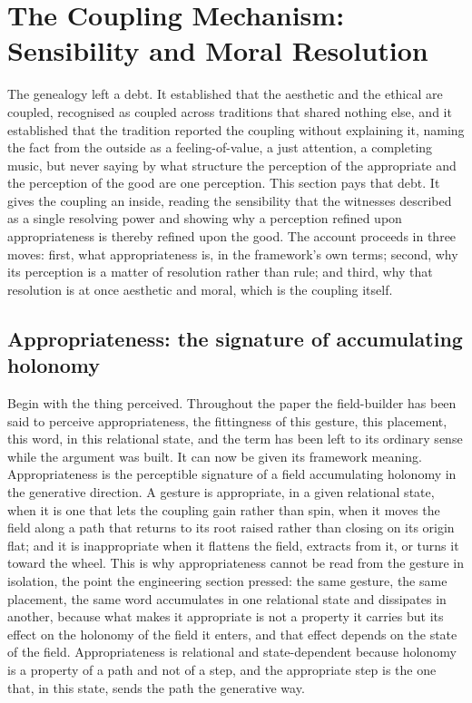 \section{The Coupling Mechanism: Sensibility and Moral Resolution}
\label{p22:sec:coupling}

\noindent
The genealogy left a debt. It established that the aesthetic and the ethical are coupled, recognised as coupled across traditions that shared nothing else, and it established that the tradition reported the coupling without explaining it, naming the fact from the outside as a feeling-of-value, a just attention, a completing music, but never saying by what structure the perception of the appropriate and the perception of the good are one perception. This section pays that debt. It gives the coupling an inside, reading the sensibility that the witnesses described as a single resolving power and showing why a perception refined upon appropriateness is thereby refined upon the good. The account proceeds in three moves: first, what appropriateness is, in the framework's own terms; second, why its perception is a matter of resolution rather than rule; and third, why that resolution is at once aesthetic and moral, which is the coupling itself.

\subsection{Appropriateness: the signature of accumulating holonomy}
\label{p22:sub:coupling-appropriateness}

Begin with the thing perceived. Throughout the paper the field-builder has been said to perceive appropriateness, the fittingness of this gesture, this placement, this word, in this relational state, and the term has been left to its ordinary sense while the argument was built. It can now be given its framework meaning. Appropriateness is the perceptible signature of a field accumulating holonomy in the generative direction. A gesture is appropriate, in a given relational state, when it is one that lets the coupling gain rather than spin, when it moves the field along a path that returns to its root raised rather than closing on its origin flat; and it is inappropriate when it flattens the field, extracts from it, or turns it toward the wheel. This is why appropriateness cannot be read from the gesture in isolation, the point the engineering section pressed: the same gesture, the same placement, the same word accumulates in one relational state and dissipates in another, because what makes it appropriate is not a property it carries but its effect on the holonomy of the field it enters, and that effect depends on the state of the field. Appropriateness is relational and state-dependent because holonomy is a property of a path and not of a step, and the appropriate step is the one that, in this state, sends the path the generative way.

